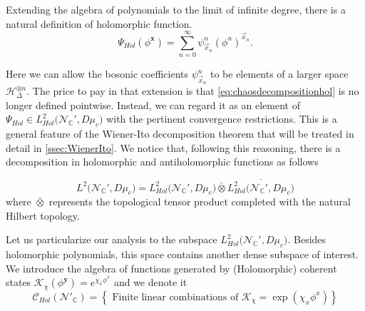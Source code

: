 \documentclass{elsarticle}%
\begin{document}
Extending the algebra of polynomials to the limit of infinite degree, there is a natural definition of holomorphic function.       
\begin{equation}
        \label{eq:chaosdecompositionhol}
        \Psi_{Hol}(\phi^{\mathbf{x}})=\sum_{n=0}^\infty\psi^{n}_{\vec{x}_n}(\phi^n)^{\vec{x}_n}.
    \end{equation}

    Here we can allow the bosonic coefficients $\psi^{n}_{\vec{x}_n}$ to be elements of a larger space $\mathcal{H}_\Delta^{\otimes n}$.
    The  price to pay in that extension is that \eqref{eq:chaosdecompositionhol} is no longer defined pointwise. Instead, we can regard it as an element of $\Psi_{Hol}\in L^2_{Hol}\big({\mathcal{N}_{\mathbb{C}}'},D\mu_c\big) $ with the pertinent convergence restrictions.
    This is a general feature of the Wiener-Ito decomposition theorem that will be treated in detail in \autoref{ssec:WienerIto}. 
    We notice that, following this reasoning,  there is a decomposition in holomorphic and antiholomorphic functions as follows

\begin{equation}
    \label{eq:ComplexHilbertspacedecomp}
    L^2\big({\mathcal{N}_{\mathbb{C}}'},D\mu_c\big)= L^2_{Hol}\big({\mathcal{N}_{\mathbb{C}}'}, D\mu_c\big)\bar{\otimes}\overline{ L^2_{{Hol}}\big({\mathcal{N}_{\mathbb{C}}'}, D\mu_c\big)}
    \end{equation}
    where $\bar{\otimes}$ represents the topological tensor product completed with the natural Hilbert topology.




Let us  particularize our analysis to the subspace $L^2_{Hol}\big({\mathcal{N}_{\mathbb{C}}'},D\mu_c\big)$. Besides holomorphic polynomials, this space  contains another dense subspace of interest. We introduce the algebra of functions generated by (Holomorphic) coherent states $\mathcal{K}_{\chi}(\phi^{\mathbf{y}})=e^{\chi_x\phi^x}$ and we denote it 
\begin{equation}
    \label{eq:CoherentStates}
    \mathcal{C}_{Hol}(\mathcal{N}'_\mathbb{C})=\left\{\textrm{ Finite linear combinations of }  \mathcal{K}_{\chi}=\exp\left(\chi_x\phi^x\right)\right\}
    \end{equation}
\end{document}
